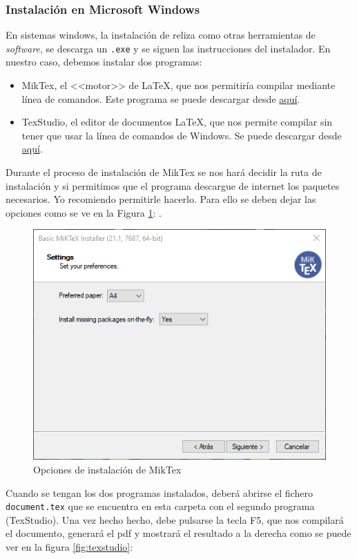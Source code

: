 \documentclass{article}
\begin{document}
\subsubsection{Instalación en Microsoft Windows}
En sistemas windows, la instalación de reliza como otras herramientas de
\textit{software}, se descarga un \texttt{.exe} y se siguen las instrucciones
del instalador. En nuestro caso, debemos instalar dos programas:
\begin{itemize}
    \item MikTex, el <<motor>> de \LaTeX{}, que nos permitiría compilar
        mediante línea de comandos. Este programa se puede descargar desde 
        \href{https://miktex.org/download}{aquí}. 
    \item TexStudio, el editor de documentos \LaTeX{}, que nos permite compilar
        sin tener que usar la línea de comandos de Windows. Se puede descargar
        desde \href{https://www.texstudio.org/}{aquí}.
\end{itemize}
Durante el proceso de
instalación de MikTex se nos hará decidir la ruta de instalación y si permitimos
que el programa descargue de internet los paquetes necesarios. Yo
recomiendo permitirle hacerlo. Para ello se deben dejar las opciones como
se ve en la Figura \ref{fig:miktex}: .
\begin{figure}[H]
    \center
    \includegraphics[width=0.75\hsize]{miktexInstall}
    \caption{Opciones de instalación de MikTex}
    \label{fig:miktex}
\end{figure}
Cuando se tengan los dos programas instalados, deberá abrirse el fichero
\texttt{document.tex} que se encuentra en esta carpeta
con el segundo programa (TexStudio). Una vez hecho hecho, debe pulsarse la tecla
F5, que nos compilará el documento, generará el pdf y mostrará el resultado a la
derecha como se puede ver en la figura \ref{fig:texstudio}:
\end{document}
